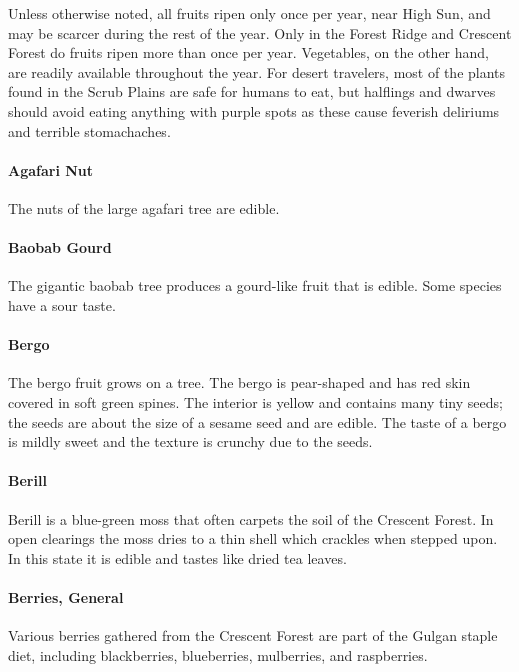 \begin{multicols}{2}

Unless otherwise noted, all fruits ripen only once per year, near High Sun, and may be scarcer during the rest of the year. Only in the Forest Ridge and Crescent Forest do fruits ripen more than once per year. Vegetables, on the other hand, are readily available throughout the year. For desert travelers, most of the plants found in the Scrub Plains are safe for humans to eat, but halflings and dwarves should avoid eating anything with purple spots as these cause feverish deliriums and terrible stomachaches.

\paragraph{Agafari Nut} The nuts of the large agafari tree are edible.\\
\paragraph{Baobab Gourd} The gigantic baobab tree produces a gourd-like fruit that is edible. Some species have a sour taste.\\
\paragraph{Bergo} The bergo fruit grows on a tree. The bergo is pear-shaped and has red skin covered in soft green spines. The interior is yellow and contains many tiny seeds; the seeds are about the size of a sesame seed and are edible. The taste of a bergo is mildly sweet and the texture is crunchy due to the seeds.\\
\paragraph{Berill} Berill is a blue-green moss that often carpets the soil of the Crescent Forest. In open clearings the moss dries to a thin shell which crackles when stepped upon. In this state it is edible and tastes like dried tea leaves.\\
\paragraph{Berries, General} Various berries gathered from the Crescent Forest are part of the Gulgan staple diet, including blackberries, blueberries, mulberries, and raspberries.\\

\end{multicols}
